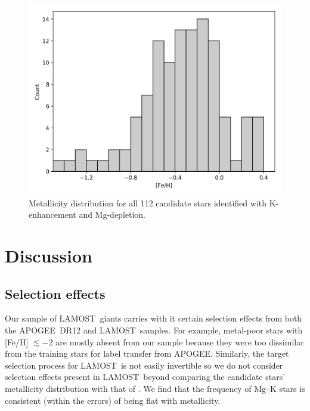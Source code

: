 \documentclass[a4paper,fleqn,usenatbib]{mnras}
\newcommand{\project}[1]{#1}
\newcommand{\lamost}{\project{LAMOST}}
\newcommand{\apogee}{\project{APOGEE}}
\begin{document}
\begin{figure}
	\includegraphics[width=\columnwidth]{mhist.png}
    \caption{Metallicity distribution for all 112 candidate stars identified with K-enhancement and Mg-depletion.}
    \label{mhist}
\end{figure}


\section{Discussion}
\label{sec:discussion}

\subsection{Selection effects}
\label{sec:selectioneffects}

Our sample of \lamost\ giants carries with it certain selection effects from both the \apogee\ DR12 and \lamost\ samples. For example, metal-poor stars with [Fe/H] $\lesssim-2$ are mostly absent from our sample because they were too dissimilar from the training stars for label transfer from \apogee. Similarly, the target selection process for \lamost\ is not easily invertible so we do not consider selection effects present in \lamost\ beyond comparing the candidate stars' metallicity distribution with that of \cite{ho2017}. We find that the frequency of Mg--K stars is consistent (within the errors) of being flat with metallicity. 
\end{document}
